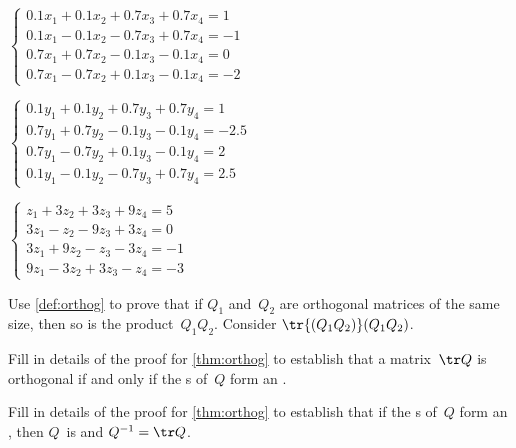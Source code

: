 \begin{exercise}
\begin{Parts}
\begin{OmitV1}
\item \(\begin{cases}
0.1x_1+0.1x_2+0.7x_3+0.7x_4=1
\\0.1x_1-0.1x_2-0.7x_3+0.7x_4=-1
\\0.7x_1+0.7x_2-0.1x_3-0.1x_4=0
\\0.7x_1-0.7x_2+0.1x_3-0.1x_4=-2
\end{cases}\)

\item \(\begin{cases}
0.1y_1+0.1y_2+0.7y_3+0.7y_4=1
\\0.7y_1+0.7y_2-0.1y_3-0.1y_4=-2.5
\\0.7y_1-0.7y_2+0.1y_3-0.1y_4=2
\\0.1y_1-0.1y_2-0.7y_3+0.7y_4=2.5
\end{cases}\)
\end{OmitV1}

\item \(\begin{cases}
  z_1+3z_2+3z_3+9z_4=5
\\3z_1-z_2-9z_3+3z_4=0
\\3z_1+9z_2-z_3-3z_4=-1
\\9z_1-3z_2+3z_3-z_4=-3
\end{cases}\)

\end{Parts}
\end{exercise}




\begin{exercise}\label{ex:orthoprod} 
Use \cref{def:orthog} to prove that if \(Q_1\) and~\(Q_2\) are orthogonal matrices of the same size, then so is the product~\(Q_1Q_2\). 
Consider \(\tr{(Q_1Q_2)}(Q_1Q_2)\).
\end{exercise}

\begin{exercise}  
Fill in details of the proof for \cref{thm:orthog} to establish 
that a matrix~\(\tr Q\) is orthogonal if and 
only if the s of~\(Q\) form an .
\end{exercise}

\begin{exercise}  
Fill in details of the proof for \cref{thm:orthog} to establish that if the s of~\(Q\) form an , then \(Q\)~is  and \(Q^{-1}=\tr Q\).
\end{exercise}

